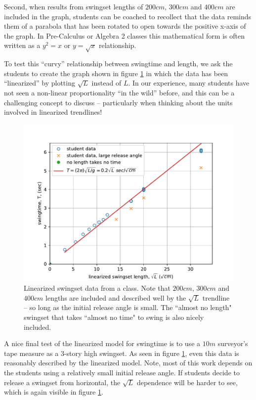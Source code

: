 \documentclass[12pt]{iopart}
\begin{document}
Second, when results from swingset lengths of $200cm$, $300cm$ and $400cm$ are included in the graph, students can be coached to recollect that the data reminds them of a parabola that has been rotated to open towards the positive x-axis of the graph.  In Pre-Calculus or Algebra 2 classes this mathematical form is often written as a $y^2=x$ or $y=\sqrt{x}$ relationship.  

To test this ``curvy'' relationship between swingtime and length, we ask the students to create the graph shown in figure \ref{linearized_swingtime_graph} in which the data has been ``linearized'' by plotting $\sqrt{L}$ instead of $L$.  In our experience, many students have not seen a non-linear proportionality ``in the wild'' before, and this can be a challenging concept to discuss -- particularly when thinking about the units involved in linearized trendlines!   

\begin{figure}[h]
\centering
	\includegraphics[width=\columnwidth]{linearized_swingtime_graph.pdf}
\caption{
	Linearized swingset data from a class.  Note that $200cm$, $300cm$ and $400cm$ lengths are included and described well by the $\sqrt{L}$ trendline -- so long as the initial release angle is small.  The ``almost no length" swingset that takes ``almost no time" to swing is also nicely included.   
	}
	\label{linearized_swingtime_graph}
\end{figure}

A nice final test of the linearized model for swingtime is to use a $10m$ surveyor's tape measure as a 3-story high swingset.  As seen in figure \ref{linearized_swingtime_graph}, even this data is reasonably described by the linearized model.  Note, most of this work depends on the students using a relatively small initial release angle.  If students decide to release a swingset from horizontal, the $\sqrt{L}$ dependence will be harder to see, which is again visible in figure \ref{linearized_swingtime_graph}.
\end{document}
